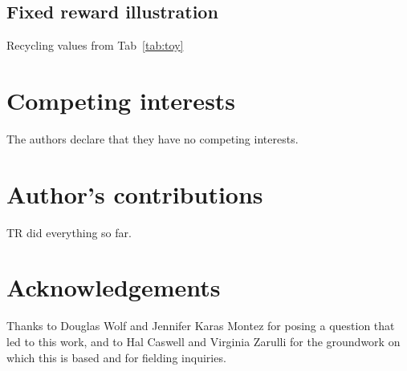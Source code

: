 \documentclass{bmcart}
\begin{document}
\subsection{Fixed reward illustration}
Recycling values from Tab~\ref{tab:toy}




\begin{backmatter}

\section*{Competing interests}
  The authors declare that they have no competing interests.

\section*{Author's contributions}
    TR did everything so far.

\section*{Acknowledgements}
  Thanks to Douglas Wolf and Jennifer Karas Montez for posing a question that led to this work, and to Hal Caswell and Virginia Zarulli for the groundwork on which this is based and for fielding inquiries.


\end{backmatter}
\end{document}
